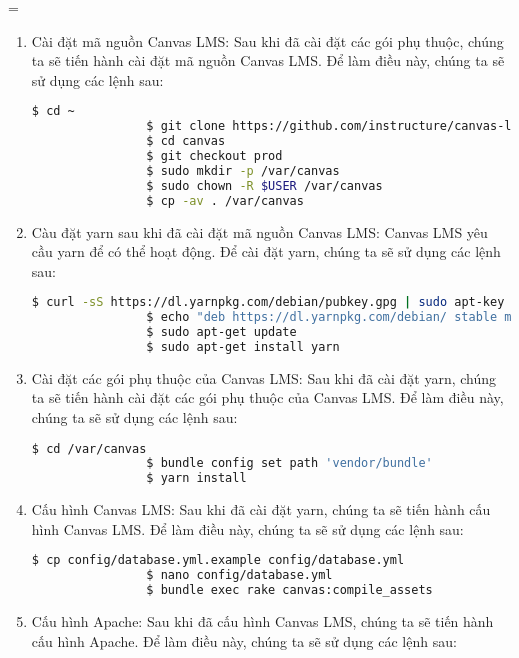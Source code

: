 =\documentclass[../Thesis.tex]{subfiles}
\begin{document}
\begin{enumerate}
            \item Cài đặt mã nguồn Canvas LMS: Sau khi đã cài đặt các gói phụ thuộc, chúng ta sẽ tiến hành cài đặt mã nguồn Canvas LMS. Để làm điều này, chúng ta sẽ sử dụng các lệnh sau:
            \begin{lstlisting}[language=bash]
                $ cd ~
                $ git clone https://github.com/instructure/canvas-lms.git canvas
                $ cd canvas
                $ git checkout prod
                $ sudo mkdir -p /var/canvas
                $ sudo chown -R $USER /var/canvas
                $ cp -av . /var/canvas
            \end{lstlisting}

            \item Càu đặt yarn sau khi đã cài đặt mã nguồn Canvas LMS: Canvas LMS yêu cầu yarn để có thể hoạt động. Để cài đặt yarn, chúng ta sẽ sử dụng các lệnh sau:
            \begin{lstlisting}[language=bash]
                $ curl -sS https://dl.yarnpkg.com/debian/pubkey.gpg | sudo apt-key add -
                $ echo "deb https://dl.yarnpkg.com/debian/ stable main" | sudo tee /etc/apt/sources.list.d/yarn.list
                $ sudo apt-get update
                $ sudo apt-get install yarn
            \end{lstlisting}

            \item Cài đặt các gói phụ thuộc của Canvas LMS: Sau khi đã cài đặt yarn, chúng ta sẽ tiến hành cài đặt các gói phụ thuộc của Canvas LMS. Để làm điều này, chúng ta sẽ sử dụng các lệnh sau:
            \begin{lstlisting}[language=bash]
                $ cd /var/canvas
                $ bundle config set path 'vendor/bundle'
                $ yarn install
            \end{lstlisting}



            \item Cấu hình Canvas LMS: Sau khi đã cài đặt yarn, chúng ta sẽ tiến hành cấu hình Canvas LMS. Để làm điều này, chúng ta sẽ sử dụng các lệnh sau:
            \begin{lstlisting}[language=bash]
                $ cp config/database.yml.example config/database.yml
                $ nano config/database.yml
                $ bundle exec rake canvas:compile_assets
            \end{lstlisting}

            \item Cấu hình Apache: Sau khi đã cấu hình Canvas LMS, chúng ta sẽ tiến hành cấu hình Apache. Để làm điều này, chúng ta sẽ sử dụng các lệnh sau:


\end{enumerate}
\end{document}
